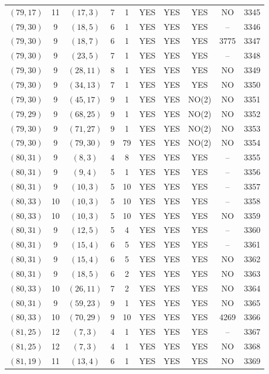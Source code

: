 \begin{longtable}{|c|c|c|c|c|c|c|c|c|c|}
$(79, 17)$ & 11 & $(17, 3)$ & 7 & 1 & YES & YES & YES & NO & 3345\\
$(79, 30)$ & 9 & $(18, 5)$ & 6 & 1 & YES & YES & YES & -- & 3346\\
$(79, 30)$ & 9 & $(18, 7)$ & 6 & 1 & YES & YES & YES & 3775 & 3347\\
$(79, 30)$ & 9 & $(23, 5)$ & 7 & 1 & YES & YES & YES & -- & 3348\\
$(79, 30)$ & 9 & $(28, 11)$ & 8 & 1 & YES & YES & YES & NO & 3349\\
$(79, 30)$ & 9 & $(34, 13)$ & 7 & 1 & YES & YES & YES & NO & 3350\\
$(79, 30)$ & 9 & $(45, 17)$ & 9 & 1 & YES & YES & NO(2) & NO & 3351\\
$(79, 29)$ & 9 & $(68, 25)$ & 9 & 1 & YES & YES & NO(2) & NO & 3352\\
$(79, 30)$ & 9 & $(71, 27)$ & 9 & 1 & YES & YES & NO(2) & NO & 3353\\
$(79, 30)$ & 9 & $(79, 30)$ & 9 & 79 & YES & YES & NO(2) & NO & 3354\\
$(80, 31)$ & 9 & $(8, 3)$ & 4 & 8 & YES & YES & YES & -- & 3355\\
$(80, 31)$ & 9 & $(9, 4)$ & 5 & 1 & YES & YES & YES & -- & 3356\\
$(80, 31)$ & 9 & $(10, 3)$ & 5 & 10 & YES & YES & YES & -- & 3357\\
$(80, 33)$ & 10 & $(10, 3)$ & 5 & 10 & YES & YES & YES & -- & 3358\\
$(80, 33)$ & 10 & $(10, 3)$ & 5 & 10 & YES & YES & YES & NO & 3359\\
$(80, 31)$ & 9 & $(12, 5)$ & 5 & 4 & YES & YES & YES & -- & 3360\\
$(80, 31)$ & 9 & $(15, 4)$ & 6 & 5 & YES & YES & YES & -- & 3361\\
$(80, 31)$ & 9 & $(15, 4)$ & 6 & 5 & YES & YES & YES & NO & 3362\\
$(80, 31)$ & 9 & $(18, 5)$ & 6 & 2 & YES & YES & YES & NO & 3363\\
$(80, 33)$ & 10 & $(26, 11)$ & 7 & 2 & YES & YES & YES & NO & 3364\\
$(80, 31)$ & 9 & $(59, 23)$ & 9 & 1 & YES & YES & YES & NO & 3365\\
$(80, 33)$ & 10 & $(70, 29)$ & 9 & 10 & YES & YES & YES & 4269 & 3366\\
$(81, 25)$ & 12 & $(7, 3)$ & 4 & 1 & YES & YES & YES & -- & 3367\\
$(81, 25)$ & 12 & $(7, 3)$ & 4 & 1 & YES & YES & YES & NO & 3368\\
$(81, 19)$ & 11 & $(13, 4)$ & 6 & 1 & YES & YES & YES & NO & 3369\\

\end{longtable}
